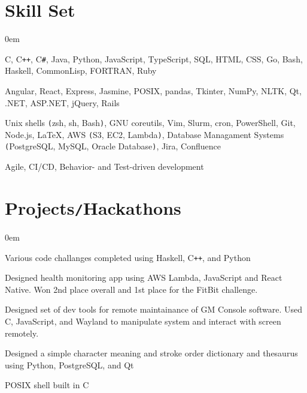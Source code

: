 \documentclass[11pt]{article}
\begin{document}
\vspace*{-15pt}
\section*{Skill Set}
\vspace*{-10pt}\hspace*{10pt}\begin{minipage}{0.935\textwidth}
    \begin{description}
        \itemsep0em
        \raggedright
        \item[Languages] C, C\texttt{++}, C\texttt{\#}, Java, Python, JavaScript, TypeScript, SQL, HTML, CSS, Go, Bash, Haskell,
            CommonLisp, FORTRAN, Ruby 
        \item[Frameworks\texttt{/}Libraries] Angular, React, Express, Jasmine, POSIX, pandas, Tkinter, NumPy, NLTK,
            Qt, .NET, ASP.NET, jQuery, Rails
        \item[Tools] Unix shells \texttt{(}zsh, sh, Bash\texttt{)}, GNU coreutils, Vim, Slurm, cron, PowerShell, Git, Node.js,
            \LaTeX, AWS \texttt{(}S3, EC2, Lambda\texttt{)}, Database Managament Systems \texttt{(}PostgreSQL, MySQL, Oracle
            Database\texttt{)}, Jira, Confluence
        \item[Methodologies] Agile, CI/CD, Behavior- and Test-driven development
    \end{description}
\end{minipage}

\vspace*{-10pt}
\section*{Projects\texttt{/}Hackathons}
\vspace*{-10pt}\hspace*{10pt}\begin{minipage}{0.93\textwidth}
    \begin{description}
        \itemsep0em
        \raggedright
        \item[Advent of Code] Various code challanges completed using Haskell, C\texttt{++}, and Python
        \item[DHack] Designed health monitoring app using AWS Lambda, JavaScript and React Native. Won 2nd place overall and 1st
            place for the FitBit challenge.
        \item[MHacks 8] Designed set of dev tools for remote maintainance of GM Console software. Used C, JavaScript, and
            Wayland to manipulate system and interact with screen remotely.
        \item[Chinese Character Dictionary] Designed a simple character meaning and stroke order dictionary and thesaurus using
            Python, PostgreSQL, and Qt
        \item[Mock Terminal] POSIX shell built in C
    \end{description}
\end{minipage}
\end{document}
